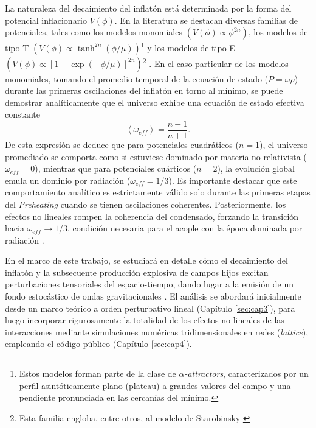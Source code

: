 La naturaleza del decaimiento del inflatón está determinada por la forma del potencial inflacionario $V(\phi)$. En la literatura se destacan diversas familias de potenciales, tales como los modelos monomiales $\displaystyle \left( V(\phi) \propto \phi^{2n} \right)$, los modelos de tipo T $\displaystyle \left( V(\phi) \propto \tanh^{2n} (\phi/\mu) \right)$\footnote{Estos modelos forman parte de la clase de \textit{$\alpha$-attractors}, caracterizados por un perfil asintóticamente plano (plateau) a grandes valores del campo y una pendiente pronunciada en las cercanías del mínimo.} y los modelos de tipo E $\displaystyle \left( V(\phi) \propto \left[ 1 - \exp (-\phi/\mu) \right]^{2n} \right)$\footnote{Esta familia engloba, entre otros, al modelo de Starobinsky \cite{Starobinsky_1980, Kallosh_2013}} \cite{Ellis_2026}. En el caso particular de los modelos monomiales, tomando el promedio temporal de la ecuación de estado ($P = \omega \rho$) durante las primeras oscilaciones del inflatón en torno al mínimo, se puede demostrar analíticamente que el universo exhibe una ecuación de estado efectiva constante \cite{Turner_1983}
\begin{equation}\label{eqn:omega_eff}
\left\langle \omega_{eff} \right\rangle = \frac{n - 1}{n + 1}.
\end{equation}
De esta expresión se deduce que para potenciales cuadráticos ($n = 1$), el universo promediado se comporta como si estuviese dominado por materia no relativista ($\omega_{eff} = 0$), mientras que para potenciales cuárticos ($n = 2$), la evolución global emula un dominio por radiación ($\omega_{eff} = 1/3$). Es importante destacar que este comportamiento analítico es estrictamente válido solo durante las primeras etapas del \textit{Preheating} cuando se tienen oscilaciones coherentes. Posteriormente, los efectos no lineales rompen la coherencia del condensado, forzando la transición hacia $\omega_{eff} \to 1/3$, condición necesaria para el acople con la época dominada por radiación \cite{Podolsky_2006}.

En el marco de este trabajo, se estudiará en detalle cómo el decaimiento del inflatón y la subsecuente producción explosiva de campos hijos excitan perturbaciones tensoriales del espacio-tiempo, dando lugar a la emisión de un fondo estocástico de ondas gravitacionales \cite{Caprini_2020, Dufaux_2007, Figueroa_2017_GW}. El análisis se abordará inicialmente desde un marco teórico a orden perturbativo lineal (Capítulo \ref{sec:cap3}), para luego incorporar rigurosamente la totalidad de los efectos no lineales de las interacciones mediante simulaciones numéricas tridimensionales en redes (\textit{lattice}), empleando el código público \CosmoLattice \cite{CosmoLatticeNet, Figueroa2021, Figueroa2023} (Capítulo \ref{sec:cap4}).